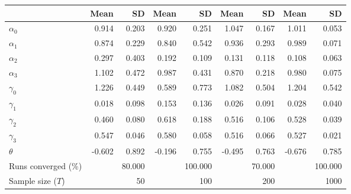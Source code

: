 
\begin{tabular}[t]{lrrrrrrrr}
\toprule
  & Mean & SD & Mean  & SD  & Mean   & SD   & Mean    & SD   \\
\midrule
$\alpha_{0}$ & 0.914 & 0.203 & 0.920 & 0.251 & 1.047 & 0.167 & 1.011 & 0.053\\
$\alpha_{1}$ & 0.874 & 0.229 & 0.840 & 0.542 & 0.936 & 0.293 & 0.989 & 0.071\\
$\alpha_{2}$ & 0.297 & 0.403 & 0.192 & 0.109 & 0.131 & 0.118 & 0.108 & 0.063\\
$\alpha_{3}$ & 1.102 & 0.472 & 0.987 & 0.431 & 0.870 & 0.218 & 0.980 & 0.075\\
$\gamma_{0}$ & 1.226 & 0.449 & 0.589 & 0.773 & 1.082 & 0.504 & 1.204 & 0.542\\
$\gamma_{1}$ & 0.018 & 0.098 & 0.153 & 0.136 & 0.026 & 0.091 & 0.028 & 0.040\\
$\gamma_{2}$ & 0.460 & 0.080 & 0.618 & 0.188 & 0.516 & 0.106 & 0.528 & 0.039\\
$\gamma_{3}$ & 0.547 & 0.046 & 0.580 & 0.058 & 0.516 & 0.066 & 0.527 & 0.021\\
$\theta$ & -0.602 & 0.892 & -0.196 & 0.755 & -0.495 & 0.763 & -0.676 & 0.785\\
Runs converged (\%) &  & 80.000 &  & 100.000 &  & 70.000 &  & 100.000\\
Sample size ($T$) &  & 50 &  & 100 &  & 200 &  & 1000\\
\bottomrule
\end{tabular}
